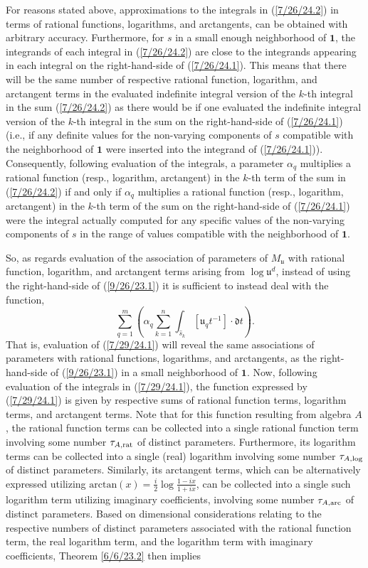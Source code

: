 \documentclass{amsart}
\numberwithin{equation}{section}
\theoremstyle{definition}
\numberwithin{theorem}{section}
\begin{document}
For reasons stated above, approximations to the integrals in (\ref{7/26/24.2}) in terms of rational functions, logarithms, and arctangents, can be obtained with arbitrary accuracy.  Furthermore, for $s$ in a small enough neighborhood of $\mathbf{1}$, the integrands of each integral in (\ref{7/26/24.2}) are close to the integrands appearing in each integral on the right-hand-side of (\ref{7/26/24.1}).  This means that there will be the same number of respective rational function, logarithm, and arctangent terms in the evaluated indefinite integral version of the $k$-th integral in the sum (\ref{7/26/24.2}) as there would be if one evaluated the indefinite integral version of the $k$-th integral in the sum on the right-hand-side of (\ref{7/26/24.1}) (i.e., if any definite values for the non-varying components of $s$ compatible with the neighborhood of $\mathbf{1}$ were inserted into the integrand of (\ref{7/26/24.1})).  Consequently, following evaluation of the integrals, a parameter $\alpha_q$ multiplies a rational function (resp., logarithm, arctangent) in the $k$-th term of the sum in (\ref{7/26/24.2}) if and only if $\alpha_q$ multiplies a rational function (resp., logarithm, arctangent) in the $k$-th term of the sum on the right-hand-side of (\ref{7/26/24.1}) were the integral actually computed for any specific values of the non-varying components of $s$ in the range of values compatible with the neighborhood of $\mathbf{1}$.  


So, as regards evaluation of the association of parameters of $M_{\mathfrak{u}}$ with rational function, logarithm, and arctangent terms arising from $\log\mathfrak{u}^d$, instead of using the right-hand-side of (\ref{9/26/23.1}) it is sufficient to instead deal with the function,
\begin{equation}\label{7/29/24.1} \sum_{q=1}^m \left(\alpha_q\sum_{k=1}^n \int_{\hat{s}_k} [\mathfrak{u}_q t^{-1}]\cdot \mathfrak{d}t\right).\end{equation} That is, evaluation of (\ref{7/29/24.1}) will reveal the same associations of parameters with rational functions, logarithms, and arctangents, as the right-hand-side of (\ref{9/26/23.1}) in a small neighborhood of $\mathbf{1}$.  Now, following evaluation of the integrals in (\ref{7/29/24.1}), the function expressed by (\ref{7/29/24.1}) is given by respective sums of rational function terms, logarithm terms, and arctangent terms.  Note that for this function resulting from algebra $A$, the rational function terms can be collected into a single rational function term involving some number $\tau_{A,{\rm rat}}$ of distinct parameters.  Furthermore, its logarithm terms can be collected into a single (real) logarithm involving some number $\tau_{A,{\rm log}}$ of distinct parameters.  Similarly, its arctangent terms, which can be alternatively expressed utilizing $\text{arctan}(x) = \frac{i}{2}\log\frac{1-ix}{1+ix}$, can be collected into a single such logarithm term utilizing imaginary coefficients, involving some number $\tau_{A,{\rm arc}}$ of distinct parameters. 
Based on dimensional considerations relating to the respective numbers of distinct parameters associated with the rational function term, the real logarithm term, and the logarithm term with imaginary coefficients, Theorem \ref{6/6/23.2} then implies
\end{document}

